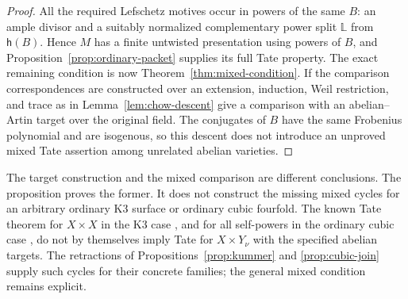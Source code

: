 \begin{proof}
All the required Lefschetz motives occur in powers of the same
$B$: an ample divisor and a suitably normalized complementary
power split $\mathbb L$ from $\mathsf h(B)$. Hence $M$ has a
finite untwisted presentation using powers of $B$, and
Proposition~\ref{prop:ordinary-packet} supplies its full Tate
property. The exact remaining condition is now
Theorem~\ref{thm:mixed-condition}. If the comparison
correspondences are constructed over an extension, induction,
Weil restriction, and trace as in Lemma~\ref{lem:chow-descent}
give a comparison with an abelian--Artin target over the original
field. The conjugates of $B$ have the same Frobenius polynomial
and are isogenous, so this descent does not introduce an
unproved mixed Tate assertion among unrelated abelian varieties.
\end{proof}

The target construction and the mixed comparison are different
conclusions. The proposition proves the former. It does not
construct the missing mixed cycles for an arbitrary ordinary K3
surface or ordinary cubic fourfold. The known Tate theorem for
$X\times X$ in the K3 case
\citep[Theorem 1.5]{IIK2021}, and for all self-powers in the
ordinary cubic case \citep[Corollary 5.2, author preprint p.~8]{Zarhin2004},
do not by themselves imply Tate for $X\times Y_\nu$ with the
specified abelian targets. The retractions of
Propositions~\ref{prop:kummer} and \ref{prop:cubic-join} supply
such cycles for their concrete families; the general mixed
condition remains explicit.
